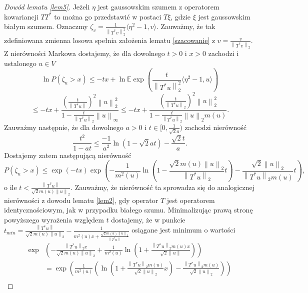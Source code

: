 \documentclass[man,mfiu]{mgrwms}
\newcommand{\norm}[1]{\left\lVert#1\right\rVert}
\begin{document}
\begin{proof}[Dowód lematu \ref{lem5}]
Jeżeli $\eta$ jest gaussowskim szumem z operatorem kowariancji $TT^*$ to można go przedstawić w postaci $T\xi$, gdzie $\xi$ jest gaussowskim białym szumem. Oznaczmy $\zeta_v=\frac{1}{\norm{T^*v}_2^2}\langle \eta^2-1,v\rangle$. Zauważmy, że tak zdefiniowana zmienna losowa spełnia założenia lematu \ref{szacowanie} z $v=\frac{v}{\norm{T^*v}_2}$. Z nierówności Markowa dostajemy, że dla dowolnego $t>0$ i $x>0$ zachodzi i ustalonego $u\in V$
\begin{displaymath}
\ln P(\zeta_u>x)\leq -tx+\ln\mathbb{E}\exp\left(\frac{t}{\norm{T^*u}_2^2}\langle \eta^2-1,u\rangle\right)
\end{displaymath}
\begin{displaymath}
\leq -tx+\frac{\left(\frac{t}{\norm{T^*u}}\right)^2\norm{u}_2^2}{1-\frac{t}{\norm{T^*u}_2}\norm{u}_{\infty}}\leq -tx+\frac{\left(\frac{t}{\norm{T^*u}_2}\right)^2\norm{u}_2^2}{1-\frac{t}{\norm{T^*u}_2}\norm{u}_{2}m(u)}.
\end{displaymath}
Zauważmy następnie, że dla dowolnego $a>0$ i $t\in [0,\frac{1}{\sqrt{2}a})$ zachodzi nierówność
\begin{displaymath}
\frac{t^2}{1-at}\leq \frac{-1}{a^2}\ln(1-\sqrt{2}at)-\frac{\sqrt{2}t}{a}.
\end{displaymath}
Dostajemy zatem następującą nierówność
\begin{displaymath}
P(\zeta_u>x)\leq \exp(-tx)\exp\left(-\frac{1}{m^2(u)}\ln\left(1-\frac{\sqrt{2}m(u)\norm{u}_2}{\norm{T^*u}_2}t\right)-\frac{\sqrt{2}\norm{u}_2}{\norm{T^*u}_2m(u)}t\right),
\end{displaymath}
o ile $t<\frac{\norm{T^*u}}{\sqrt{2}m(u)\norm{u}_2}.$ Zauważmy, że nierówność ta sprowadza się do analogicznej nierówności z dowodu lematu \ref{lem2}, gdy operator $T$ jest operatorem identycznościowym, jak w przypadku białego szumu.
Minimalizując prawą stronę powyższego wyrażenia względem $t$ dostajemy, że w punkcie $t_{min}=\frac{\norm{T^*u}}{\sqrt{2}m(u)\norm{u}_2}-\frac{1}{m^2(u)x+\frac{\sqrt{2}m(u)\norm{u}_2}{\norm{T^*u}}} $ osiągane jest minimum o wartości 
\begin{equation}
\begin{split}\label{sukces}
\exp&\left(-\frac{\norm{T^*u}_2x}{\sqrt{2}m(u)\norm{u}_2}+\frac{1}{m^2(u)}\ln\left(1+\frac{\norm{T^*u}_2m(u)x}{\sqrt{2}\norm{u}}\right) \right)\\
&=\exp\left(\frac{1}{m^2(u)}\left(\ln \left(1+\frac{\norm{T^*u}_2m(u)}{\sqrt{2}\norm{u}_2}x\right)-\frac{\norm{T^*u}_2m(u)}{\sqrt{2}\norm{u}_2}\right)\right)\\

\end{split}
\end{equation}
\end{proof}
\end{document}
